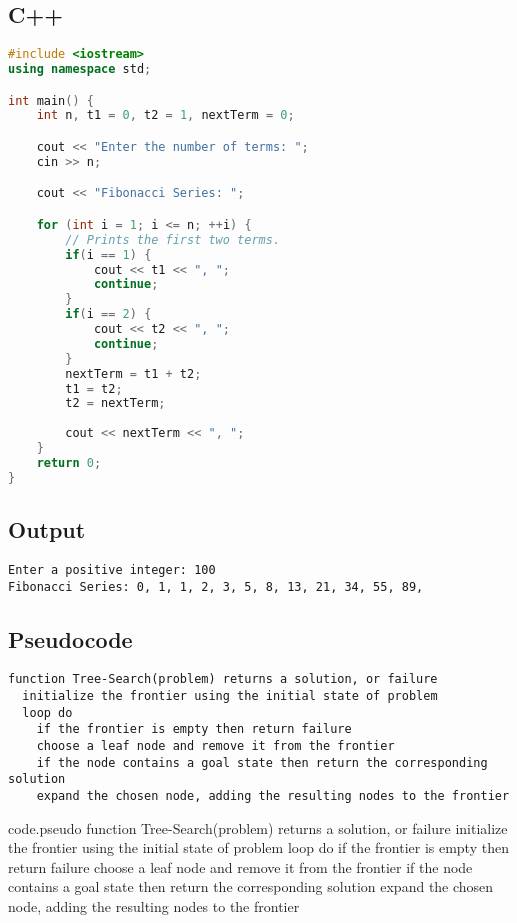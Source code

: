 \documentclass[10pt,titlepage]{article}
\begin{document}
\subsection{C++}

\begin{lstlisting}[language=c++]
#include <iostream>
using namespace std;

int main() {
    int n, t1 = 0, t2 = 1, nextTerm = 0;

    cout << "Enter the number of terms: ";
    cin >> n;

    cout << "Fibonacci Series: ";

    for (int i = 1; i <= n; ++i) {
        // Prints the first two terms.
        if(i == 1) {
            cout << t1 << ", ";
            continue;
        }
        if(i == 2) {
            cout << t2 << ", ";
            continue;
        }
        nextTerm = t1 + t2;
        t1 = t2;
        t2 = nextTerm;
        
        cout << nextTerm << ", ";
    }
    return 0;
}
\end{lstlisting}

\subsection{Output}

\begin{lstlisting}[style=lstoutput]
Enter a positive integer: 100
Fibonacci Series: 0, 1, 1, 2, 3, 5, 8, 13, 21, 34, 55, 89, 
\end{lstlisting}

\subsection{Pseudocode}

\begin{lstlisting}[language=pseudo]
function Tree-Search(problem) returns a solution, or failure
  initialize the frontier using the initial state of problem
  loop do
    if the frontier is empty then return failure
    choose a leaf node and remove it from the frontier
    if the node contains a goal state then return the corresponding solution
    expand the chosen node, adding the resulting nodes to the frontier
\end{lstlisting}

\begin{code}[pseudo]{code.pseudo}
  function Tree-Search(problem) returns a solution, or failure
  initialize the frontier using the initial state of problem
  loop do
  if the frontier is empty then return failure
  choose a leaf node and remove it from the frontier
  if the node contains a goal state then return the corresponding solution
  expand the chosen node, adding the resulting nodes to the frontier
\end{code}
\end{document}
